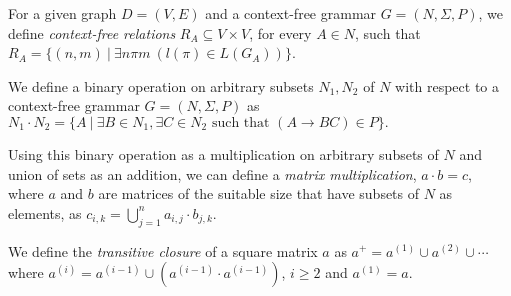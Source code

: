 For a given graph $D = (V, E)$ and a context-free grammar $G = (N, \Sigma, P)$, we define \textit{context-free relations} $R_A \subseteq V \times V$, for every $A \in N$, such that $R_A = \{(n,m)~|~\exists n \pi m~(l(\pi) \in L(G_A))\}$.

We define a binary operation on arbitrary subsets $N_1 , N_2$ of $N$ with respect to a context-free grammar $G = (N, \Sigma, P)$ as $N_1 \cdot N_2 = \{A~|~\exists B \in N_1, \exists C \in N_2 \text{ such that }(A \rightarrow B C) \in P\}.$

Using this binary operation as a multiplication on arbitrary subsets of $N$ and union of sets as an addition, we can define a \textit{matrix multiplication}, $a \cdot b = c$, where $a$ and $b$ are matrices of the suitable size that have subsets of $N$ as elements, as $c_{i,k} = \bigcup^{n}_{j=1}{a_{i,j} \cdot b_{j,k}}$.

We define the \textit{transitive closure} of a square matrix $a$ as $a^+ = a^{(1)} \cup a^{(2)} \cup \cdots$ where $a^{(i)} = a^{(i-1)} \cup (a^{(i-1)} \cdot a^{(i-1)})$, $i \ge 2$ and $a^{(1)} = a$.
